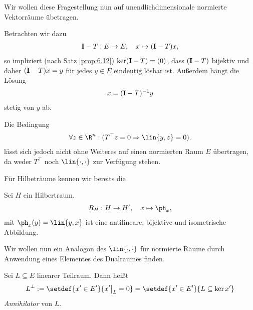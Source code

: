Wir wollen diese Fragestellung nun auf unendlichdimensionale normierte
Vektorräume übetragen.
\begin{propenum}
  \item Betrachten wir dazu
\begin{align*}
\mathbf{I}-T : E\to E,\quad x\mapsto (\mathbf{I}-T)x,
\end{align*}
so impliziert (nach Satz \ref{prop:6.12}) $\ker (\mathbf{I}-T)=(0)$, dass $(\mathbf{I}-T)$
bijektiv und daher $(\mathbf{I}-T)x=y$ für jedes $y\in E$ eindeutig lösbar ist.
Außerdem hängt die Lösung
\begin{align*}
x = (\mathbf{I}-T)^{-1}y
\end{align*}
stetig von $y$ ab.
\item Die Bedingung  
\begin{align*}
\forall z\in\R^n : (T^\top z = 0\Rightarrow \lin{y,z} = 0).
\end{align*}
lässt sich jedoch nicht ohne Weiteres auf einen normierten Raum $E$ übertragen,
da weder $T^\top$ noch $\lin{\cdot,\cdot}$ zur Verfügung stehen.

Für Hilbeträume kennen wir bereits die
\begin{prop}
\label{prop:6.14}
Sei $H$ ein Hilbertraum.
\begin{align*}
R_H: H\to H',\quad x\mapsto \ph_x,
\end{align*}
mit $\ph_x(y) = \lin{y,x}$ ist eine antilineare, bijektive und isometrische
Abbildung.\fishhere
\end{prop}

Wir wollen nun ein Analogon des $\lin{\cdot,\cdot}$ für normierte Räume durch
Anwendung eines Elementes des Dualraumes finden.
\end{propenum}

\begin{defn}
\label{defn:6.15}
Sei $L\subseteq E$ linearer Teilraum. Dann heißt
\begin{align*}
L^\bot := \setdef{x'\in E'}{x'\big|_L = 0} = \setdef{x'\in E'}{L\subseteq \ker
x'}
\end{align*}
\emph{Annihilator} von $L$.\fishhere
\end{defn}

